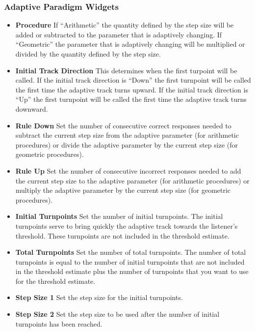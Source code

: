 \documentclass[a4paper,12pt,english]{sphinxmanual}
\begin{document}
\subsubsection{Adaptive Paradigm Widgets}
\label{graphical_user_interface:adaptive-paradigm-widgets}\begin{itemize}
\item {} 
\textbf{Procedure} If “Arithmetic” the quantity defined by the step size
will be added or subtracted to the parameter that is adaptively
changing. If “Geometric” the parameter that is adaptively changing
will be multiplied or divided by the quantity defined by the step
size.

\item {} 
\textbf{Initial Track Direction} This determines when the first turpoint
will be called. If the initial track direction is “Down” the first
turnpoint will be called the first time the adaptive track turns
upward. If the initial track direction is “Up” the first turnpoint
will be called the first time the adaptive track turns downward.

\item {} 
\textbf{Rule Down} Set the number of consecutive correct responses needed
to subtract the current step size from the adaptive parameter (for
arithmetic procedures) or divide the adaptive parameter by the
current step size (for geometric procedures).

\item {} 
\textbf{Rule Up} Set the number of consecutive incorrect responses needed
to add the current step size to the adaptive parameter (for
arithmetic procedures) or multiply the adaptive parameter by the
current step size (for geometric procedures).

\item {} 
\textbf{Initial Turnpoints} Set the number of initial turnpoints. The
initial turnpoints serve to bring quickly the adaptive track towards
the listener’s threshold. These turnpoints are not included in the
threshold estimate.

\item {} 
\textbf{Total Turnpoints} Set the number of total turnpoints. The number
of total turnpoints is equal to the number of initial turnpoints that
are not included in the threshold estimate plus the number of
turnpoints that you want to use for the threshold estimate.

\item {} 
\textbf{Step Size 1} Set the step size for the initial turnpoints.

\item {} 
\textbf{Step Size 2} Set the step size to be used after the number of
initial turnpoints has been reached.

\end{itemize}
\end{document}

